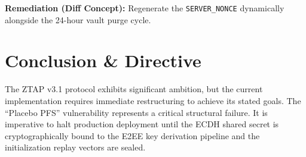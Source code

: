 \documentclass[11pt,a4paper]{article}
\begin{document}
\textbf{Remediation (Diff Concept):}
Regenerate the \texttt{SERVER\_NONCE} dynamically alongside the 24-hour vault purge cycle.

\section{Conclusion \& Directive}
The ZTAP v3.1 protocol exhibits significant ambition, but the current implementation requires immediate restructuring to achieve its stated goals. The ``Placebo PFS'' vulnerability represents a critical structural failure. It is imperative to halt production deployment until the ECDH shared secret is cryptographically bound to the E2EE key derivation pipeline and the initialization replay vectors are sealed.
\end{document}
